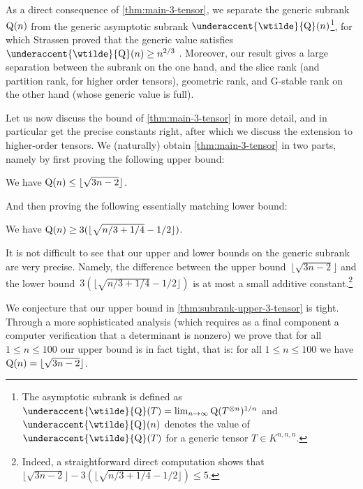 \documentclass[11pt]{article}
\theoremstyle{definition}
\theoremstyle{remark}
\newcommand{\subrank}{{\rm Q}}
\newcommand{\gensubrank}{{\rm Q}}
\DeclareMathOperator{\asympsubrank}{\underaccent{\wtilde}{Q}}
\begin{document}
As a direct consequence of \autoref{thm:main-3-tensor}, we separate the generic subrank~$\gensubrank(n)$ from the generic asymptotic subrank $\asympsubrank(n)$\footnote{The asymptotic subrank is defined as $\asympsubrank(T) = \lim_{n\to\infty} \subrank(T^{\otimes n})^{1/n}$ and $\asympsubrank(n)$ denotes the value of $\asympsubrank(T)$ for a generic tensor $T \in K^{n,n,n}$.}, for which Strassen proved that the generic value satisfies~$\asympsubrank(n) \geq n^{2/3}$ \cite[Prop.~3.6]{strassen1988asymptotic}. Moreover, our result gives a large separation between the subrank on the one hand, and the slice rank (and partition rank, for higher order tensors), geometric rank, and G-stable rank on the other hand (whose generic value is full).

Let us now discuss the bound of \autoref{thm:main-3-tensor} in more detail, and in particular get the precise constants right, after which we discuss the extension to higher-order tensors.
We (naturally) obtain \autoref{thm:main-3-tensor} in two parts, namely by first proving the following upper bound:

\begin{theorem} \label{thm:subrank-upper-3-tensor}
%
We have 
$\gensubrank(n) \leq \lfloor\sqrt{3n-2}\rfloor$.
\end{theorem}

And then proving the following essentially matching lower bound:

\begin{theorem}\label{thm:subrank-lower-3-tensor}
We have $\gensubrank(n) \geq 3(\lfloor\sqrt{n/3 + 1/4}-1/2\rfloor)$.
\end{theorem}

%
It is not difficult to see that our upper and lower bounds on the generic subrank are very precise. Namely, 
the difference between the upper bound~$\lfloor\sqrt{3n-2}\rfloor$ 
and the lower bound~$3(\lfloor\sqrt{n/3 + 1/4}-1/2\rfloor)$ 
is at most a small additive constant.\footnote{Indeed, a straightforward direct computation shows that  $\lfloor\sqrt{3n-2}\rfloor - 3(\lfloor\sqrt{n/3 + 1/4}-1/2\rfloor) \leq 5$.}

We conjecture that our upper bound in \autoref{thm:subrank-upper-3-tensor} is tight.
Through a more sophisticated analysis (which requires as a final component a computer verification that a determinant is nonzero) we prove that for all $1\leq n \leq 100$ our upper bound is in fact tight, that is: for all $1 \leq n \leq 100$ we have $\gensubrank(n) = \lfloor\sqrt{3n-2}\rfloor$. 
\end{document}
